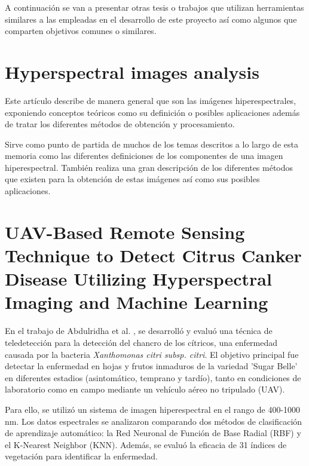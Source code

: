 
A continuación se van a presentar otras tesis o trabajos que utilizan herramientas similares a las empleadas en el desarrollo de este proyecto así como algunos que comparten objetivos comunes o similares.

\section{Hyperspectral images analysis}

Este artículo describe \cite{romangonzalez:hal-00935014} de manera general que son las imágenes hiperespectrales, exponiendo conceptos teóricos como su definición o posibles aplicaciones además de tratar los diferentes métodos de obtención y procesamiento.

Sirve como punto de partida de muchos de los temas descritos a lo largo de esta memoria como las diferentes definiciones de los componentes de una imagen hiperespectral. También realiza una gran descripción de los diferentes métodos que existen para la obtención de estas imágenes así como sus posibles aplicaciones.



\section{UAV-Based Remote Sensing Technique to Detect Citrus Canker Disease Utilizing Hyperspectral Imaging and Machine Learning}

En el trabajo de Abdulridha et al. \cite{rs11111373}, se desarrolló y evaluó una técnica de teledetección para la detección del chancro de los cítricos, una enfermedad causada por la bacteria \textit{Xanthomonas citri subsp. citri}. El objetivo principal fue detectar la enfermedad en hojas y frutos inmaduros de la variedad 'Sugar Belle' en diferentes estadios (asintomático, temprano y tardío), tanto en condiciones de laboratorio como en campo mediante un vehículo aéreo no tripulado (UAV). 

Para ello, se utilizó un sistema de imagen hiperespectral en el rango de 400-1000 nm. Los datos espectrales se analizaron comparando dos métodos de clasificación de aprendizaje automático: la Red Neuronal de Función de Base Radial (RBF) y el K-Nearest Neighbor (KNN). Además, se evaluó la eficacia de 31 índices de vegetación para identificar la enfermedad.



